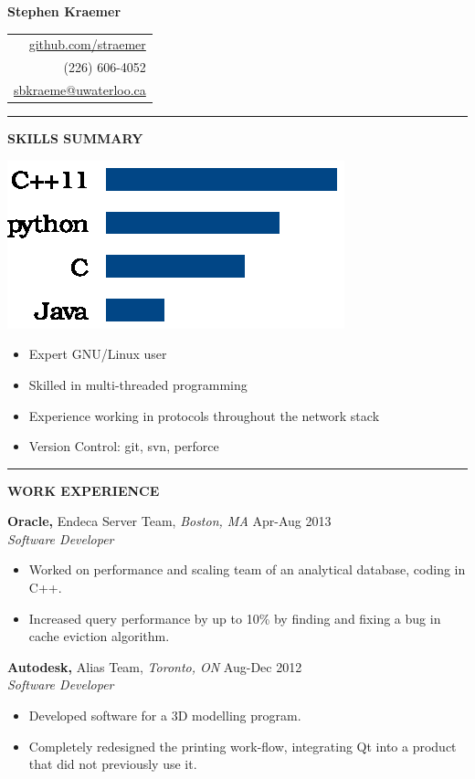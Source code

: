 \documentclass{letter}
\begin{document}
{\Huge\bf Stephen Kraemer} \hfill
\begin{tabular}{r}
  \href{https://github.com/straemer}{github.com/straemer} \\
  (226) 606-4052 \\
  \href{mailto:sbkraeme@uwaterloo.ca}{sbkraeme@uwaterloo.ca}
\end{tabular}

\vskip 2pt
\hrule

{\large\bf SKILLS SUMMARY}

\begin{minipage}{0.35\textwidth}
  \includegraphics{programming_languages.eps}
\end{minipage}
\begin{minipage}{0.65\textwidth}
  \begin{itemize}
    \item Expert GNU/Linux user
    \item Skilled in multi-threaded programming
    \item Experience working in protocols throughout the network stack
    \item Version Control: git, svn, perforce
  \end{itemize}
\end{minipage}

\vskip 2pt
\hrule
{\large\bf WORK EXPERIENCE}

{\bf Oracle,} Endeca Server Team, {\sl Boston, MA} \hfill Apr-Aug 2013 \\
{\sl Software Developer}
\begin{itemize}
  \item Worked on performance and scaling team of an analytical database, coding in C++.
  \item Increased query performance by up to 10\% by finding and fixing a bug in cache eviction algorithm.
\end{itemize}

{\bf Autodesk,} Alias Team, {\sl Toronto, ON} \hfill Aug-Dec 2012 \\
{\sl Software Developer}
\begin{itemize}
  \item Developed software for a 3D modelling program.
  \item Completely redesigned the printing work-flow, integrating Qt into a product that did not previously use it.
\end{itemize}
\end{document}
